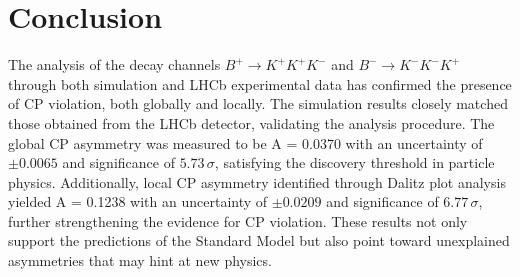 \chapter{Conclusion}\label{ch:conclusion}
The analysis of the decay channels $B^{+}\to K^+K^+K^−$ and $B^- \to K^- K^- K^+$ through both simulation and LHCb experimental data has confirmed the presence of CP violation, both globally and locally. The simulation results closely matched those obtained from the LHCb detector, validating the analysis procedure. The global CP asymmetry was measured to be A = 0.0370 with an uncertainty of $\pm 0.0065$ and significance of $5.73\,\sigma$, satisfying the discovery threshold in particle physics. Additionally, local CP asymmetry identified through Dalitz plot analysis yielded A = 0.1238 with an uncertainty of $\pm 0.0209$ and significance of $6.77\,\sigma$, further strengthening the evidence for CP violation. These results not only support the predictions of the Standard Model but also point toward unexplained asymmetries that may hint at new physics.
